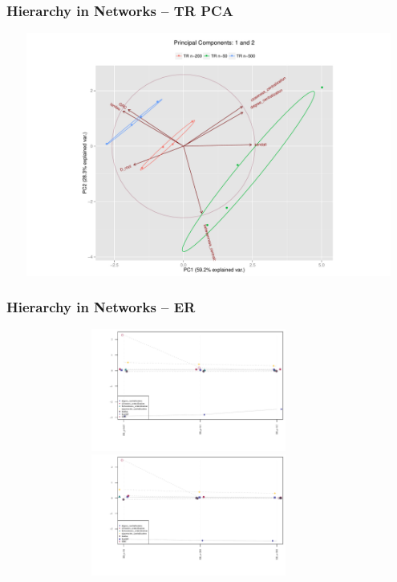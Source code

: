 \documentclass[xcolor={table}]{beamer}
\newenvironment{changemargin}[2]{%
  \begin{list}{}{%
    \setlength{\topsep}{0pt}%
    \setlength{\leftmargin}{#1}%
    \setlength{\rightmargin}{#2}%
    \setlength{\listparindent}{\parindent}%
    \setlength{\itemindent}{\parindent}%
    \setlength{\parsep}{\parskip}%
  }%
  \item[]}{\end{list}}
\begin{document}
\begin{frame}\frametitle{Hierarchy in Networks -- TR PCA}
	\begin{changemargin}{-2cm}{ -2cm}
		\centering
		\includegraphics[width=15cm, height=8cm]{images/TR_Size_PCA_Components1_2.pdf}
	\end{changemargin}
\end{frame}

\begin{frame}\frametitle{Hierarchy in Networks -- ER}
	\begin{changemargin}{-2cm}{ -2cm}
		\centering
			\includegraphics[width=12cm, height=4cm]{images/ER_Param_Averages.pdf}
			\\
			\includegraphics[width=12cm, height=4cm]{images/ER_Size_Averages.pdf}
	\end{changemargin}
\end{frame}
\end{document}
